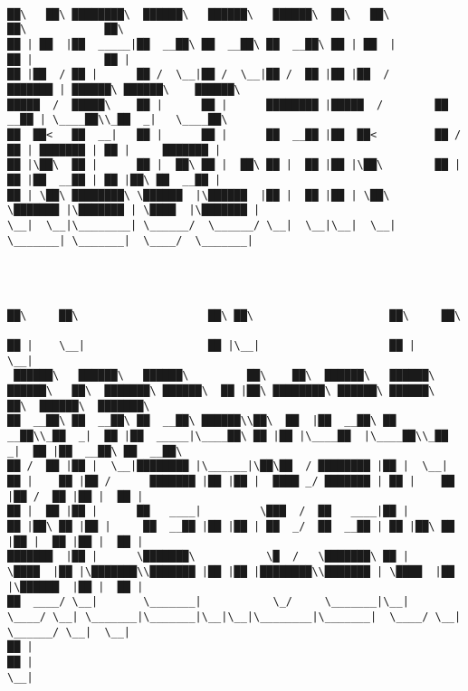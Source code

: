 \documentclass[varwidth=\maxdimen,margin=0.5cm,multi={verbatim}]{standalone}
\begin{document}
\begin{verbatim}

██\   ██\ ████████\  ██████\   ██████\   ██████\  ██\   ██\             ██\            ██\
██ | ██  |██  _____|██  __██\ ██  __██\ ██  __██\ ██ | ██  |            ██ |           ██ |
██ |██  / ██ |      ██ /  \__|██ /  \__|██ /  ██ |██ |██  /        ███████ | ██████\ ██████\    ██████\
█████  /  █████\    ██ |      ██ |      ████████ |█████  /        ██  __██ | \____██\\_██  _|   \____██\
██  ██<   ██  __|   ██ |      ██ |      ██  __██ |██  ██<         ██ /  ██ | ███████ | ██ |     ███████ |
██ |\██\  ██ |      ██ |  ██\ ██ |  ██\ ██ |  ██ |██ |\██\        ██ |  ██ |██  __██ | ██ |██\ ██  __██ |
██ | \██\ ████████\ \██████  |\██████  |██ |  ██ |██ | \██\       \███████ |\███████ | \████  |\███████ |
\__|  \__|\________| \______/  \______/ \__|  \__|\__|  \__|       \_______| \_______|  \____/  \_______|



                                                                     ██\     ██\                    ██\ ██\                     ██\     ██\
                                                                     ██ |    \__|                   ██ |\__|                    ██ |    \__|
 ██████\   ██████\   ██████\         ██\    ██\  ██████\   ██████\ ██████\   ██\  ███████\ ██████\  ██ |██\ ████████\ ██████\ ██████\   ██\  ██████\  ███████\
██  __██\ ██  __██\ ██  __██\ ██████\\██\  ██  |██  __██\ ██  __██\\_██  _|  ██ |██  _____|\____██\ ██ |██ |\____██  |\____██\\_██  _|  ██ |██  __██\ ██  __██\
██ /  ██ |██ |  \__|████████ |\______|\██\██  / ████████ |██ |  \__| ██ |    ██ |██ /      ███████ |██ |██ |  ████ _/ ███████ | ██ |    ██ |██ /  ██ |██ |  ██ |
██ |  ██ |██ |      ██   ____|         \███  /  ██   ____|██ |       ██ |██\ ██ |██ |     ██  __██ |██ |██ | ██  _/  ██  __██ | ██ |██\ ██ |██ |  ██ |██ |  ██ |
███████  |██ |      \███████\           \█  /   \███████\ ██ |       \████  |██ |\███████\\███████ |██ |██ |████████\\███████ | \████  |██ |\██████  |██ |  ██ |
██  ____/ \__|       \_______|           \_/     \_______|\__|        \____/ \__| \_______|\_______|\__|\__|\________|\_______|  \____/ \__| \______/ \__|  \__|
██ |
██ |
\__|





\end{verbatim}
\end{document}
